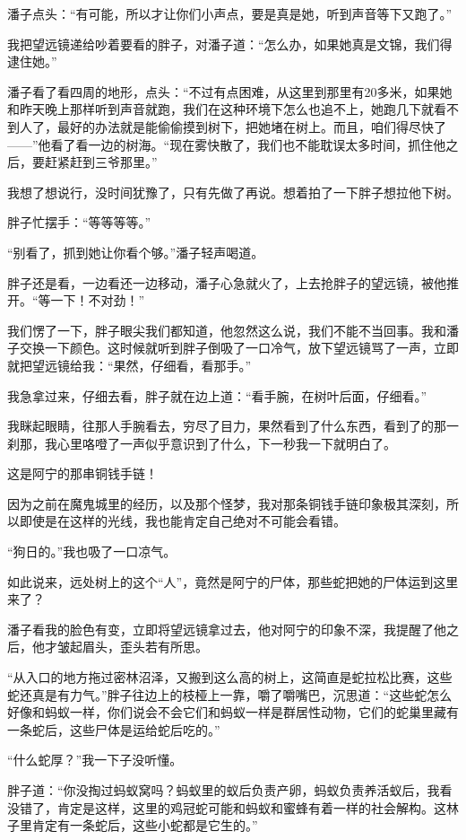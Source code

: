 潘子点头：“有可能，所以才让你们小声点，要是真是她，听到声音等下又跑了。”

我把望远镜递给吵着要看的胖子，对潘子道：“怎么办，如果她真是文锦，我们得逮住她。”

潘子看了看四周的地形，点头：“不过有点困难，从这里到那里有20多米，如果她和昨天晚上那样听到声音就跑，我们在这种环境下怎么也追不上，她跑几下就看不到人了，最好的办法就是能偷偷摸到树下，把她堵在树上。而且，咱们得尽快了——”他看了看一边的树海。“现在雾快散了，我们也不能耽误太多时间，抓住他之后，要赶紧赶到三爷那里。”

我想了想说行，没时间犹豫了，只有先做了再说。想着拍了一下胖子想拉他下树。

胖子忙摆手：“等等等等。”

“别看了，抓到她让你看个够。”潘子轻声喝道。

胖子还是看，一边看还一边移动，潘子心急就火了，上去抢胖子的望远镜，被他推开。“等一下！不对劲！”

我们愣了一下，胖子眼尖我们都知道，他忽然这么说，我们不能不当回事。我和潘子交换一下颜色。这时候就听到胖子倒吸了一口冷气，放下望远镜骂了一声，立即就把望远镜给我：“果然，仔细看，看那手。”

我急拿过来，仔细去看，胖子就在边上道：“看手腕，在树叶后面，仔细看。”

我眯起眼睛，往那人手腕看去，穷尽了目力，果然看到了什么东西，看到了的那一刹那，我心里咯噔了一声似乎意识到了什么，下一秒我一下就明白了。

这是阿宁的那串铜钱手链！

因为之前在魔鬼城里的经历，以及那个怪梦，我对那条铜钱手链印象极其深刻，所以即使是在这样的光线，我也能肯定自己绝对不可能会看错。

“狗日的。”我也吸了一口凉气。

如此说来，远处树上的这个“人”，竟然是阿宁的尸体，那些蛇把她的尸体运到这里来了？

潘子看我的脸色有变，立即将望远镜拿过去，他对阿宁的印象不深，我提醒了他之后，他才皱起眉头，歪头若有所思。

“从入口的地方拖过密林沼泽，又搬到这么高的树上，这简直是蛇拉松比赛，这些蛇还真是有力气。”胖子往边上的枝桠上一靠，嚼了嚼嘴巴，沉思道：“这些蛇怎么好像和蚂蚁一样，你们说会不会它们和蚂蚁一样是群居性动物，它们的蛇巢里藏有一条蛇后，这些尸体是运给蛇后吃的。”

“什么蛇厚？”我一下子没听懂。

胖子道：“你没掏过蚂蚁窝吗？蚂蚁里的蚁后负责产卵，蚂蚁负责养活蚁后，我看没错了，肯定是这样，这里的鸡冠蛇可能和蚂蚁和蜜蜂有着一样的社会解构。这林子里肯定有一条蛇后，这些小蛇都是它生的。”

